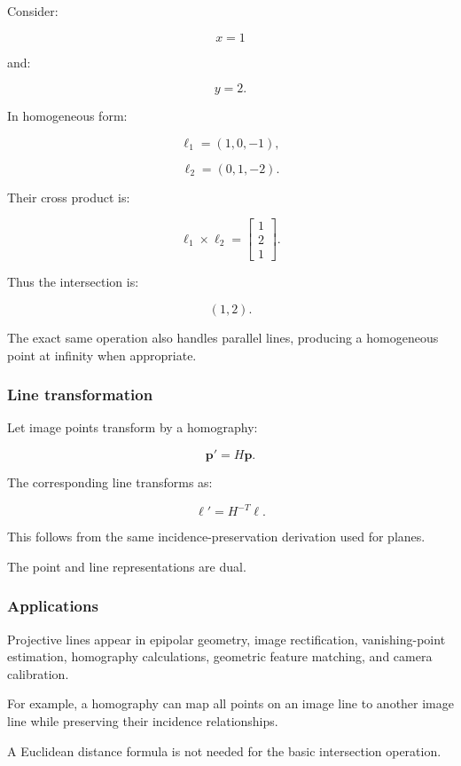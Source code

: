 Consider:

\[
 x=1
\]

and:

\[
 y=2.
\]

In homogeneous form:

\[
 \boldsymbol\ell_1=(1,0,-1),
\]

\[
 \boldsymbol\ell_2=(0,1,-2).
\]

Their cross product is:

\[
 \boldsymbol\ell_1\times\boldsymbol\ell_2 = \begin{bmatrix} 1\\2\\1 \end{bmatrix}.
\]

Thus the intersection is:

\[
 \boxed{(1,2)}.
\]

The exact same operation also handles parallel lines, producing a homogeneous point at infinity when appropriate.

\subsubsection{Line transformation}\label{02-foundations-ii-ch032-line-transformation}

Let image points transform by a homography:

\[
 \mathbf p'=H\mathbf p.
\]

The corresponding line transforms as:

\[
 \boxed{ \boldsymbol\ell'=H^{-T}\boldsymbol\ell }.
\]

This follows from the same incidence-preservation derivation used for planes.

The point and line representations are dual.

\subsubsection{Applications}\label{02-foundations-ii-ch032-applications}

Projective lines appear in epipolar geometry, image rectification, vanishing-point estimation, homography calculations, geometric feature matching, and camera calibration.

For example, a homography can map all points on an image line to another image line while preserving their incidence relationships.

A Euclidean distance formula is not needed for the basic intersection operation.

